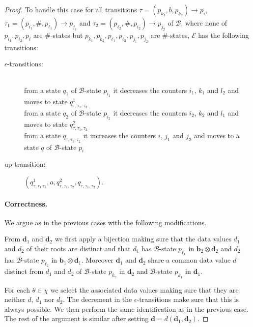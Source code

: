 \documentclass{CSML}
\newcommand\ra{\ensuremath{\rightarrow}}
\newcommand\Ba{\mathcal{B}}
\newcommand\Ea{\mathcal{E}}
\newcommand\btree{\boldsymbol{b}}
\newcommand\dtree{\boldsymbol{d}}
\begin{document}
\begin{proof}
To handle this case for all transitions
$\tau = (p_{k_1},b,p_{k_2}) \ra p_{i}$,
$\tau_1=(p_{i_1},\#,p_{\ell_1})\ra p_{j_1}$ and 
$\tau_2=(p_{\ell_2},\#,p_{i_2})\ra p_{j_2}$ of $\Ba$, 
where none of $p_{i_1},p_{i_2}, p_i$ are $\#$-states but
$p_{k_1},p_{k_2},p_{\ell_1},p_{\ell_2},p_{j_1},p_{j_2}$ are $\#$-states, $\Ea$ has the following
transitions:
\begin{description}
\item[\rm $\epsilon$-transitions:]\quad\\
from a state $q_1$ of $\Ba$-state $p_{i_1}$
it decreases the counters $i_1$, $k_1$ and $l_2$ 
and moves to state $q_{\tau,\tau_1,\tau_2}^1$\\
from a state $q_2$ of $\Ba$-state $p_{i_2}$ 
it decreases the counters $i_2$, $k_2$ and $l_1$ 
and moves to state $q_{\tau,\tau_1,\tau_2}^2$\\
from a state $q_{\tau,\tau_1,\tau_2}$ 
it increases the counters $i$, $j_1$ and $j_2$ 
and moves to a state $q$ of $\Ba$-state $p_i$

\item[\rm up-transition:]
$(q_{\tau,\tau_1\,\tau_2}^1,a,q_{\tau,\tau_1,\tau_2}^2,q_{\tau,\tau_1,\tau_2})$.
\end{description}

\paragraph{\bf Correctness.}  
We argue as in the previous cases with the following modifications.

From $\dtree_1$ and $\dtree_2$ we first apply a bijection making sure that the
data values $d_1$ and $d_2$ of their roots are distinct and that $d_1$ has
$\Ba$-state $p_{\ell_1}$ in $\btree_2\otimes\dtree_2$ and $d_2$ has $\Ba$-state $p_{\ell_2}$ in
$\btree_1\otimes\dtree_1$. Moreover $\dtree_1$ and $\dtree_2$ share a common data value $d$
distinct from $d_1$ and $d_2$ of $\Ba$-state $p_{k_2}$ in $\dtree_2$ and
$\Ba$-state $p_{k_1}$ in $\dtree_1$.

For each $\theta \in \chi$ we select the associated data values making sure
that they are neither $d$, $d_1$ nor $d_2$. The decrement in the $\epsilon$-transitions make sure
that this is always possible. We then perform the same identification as in the
previous case. 
The rest of the argument is similar after setting $\dtree=d(\dtree_1,\dtree_2)$.


\end{proof}
\end{document}
